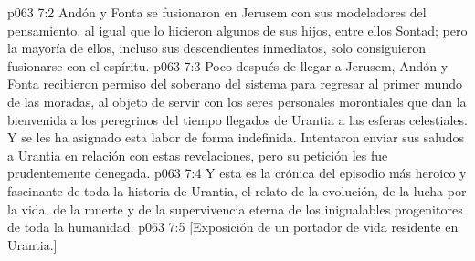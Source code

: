 \vs p063 7:2 Andón y Fonta se fusionaron en Jerusem con sus modeladores del pensamiento, al igual que lo hicieron algunos de sus hijos, entre ellos Sontad; pero la mayoría de ellos, incluso sus descendientes inmediatos, solo consiguieron fusionarse con el espíritu.
\vs p063 7:3 Poco después de llegar a Jerusem, Andón y Fonta recibieron permiso del soberano del sistema para regresar al primer mundo de las moradas, al objeto de servir con los seres personales morontiales que dan la bienvenida a los peregrinos del tiempo llegados de Urantia a las esferas celestiales. Y se les ha asignado esta labor de forma indefinida. Intentaron enviar sus saludos a Urantia en relación con estas revelaciones, pero su petición les fue prudentemente denegada.
\vs p063 7:4 \pc Y esta es la crónica del episodio más heroico y fascinante de toda la historia de Urantia, el relato de la evolución, de la lucha por la vida, de la muerte y de la supervivencia eterna de los inigualables progenitores de toda la humanidad.
\vsetoff
\vs p063 7:5 [Exposición de un portador de vida residente en Urantia.]
